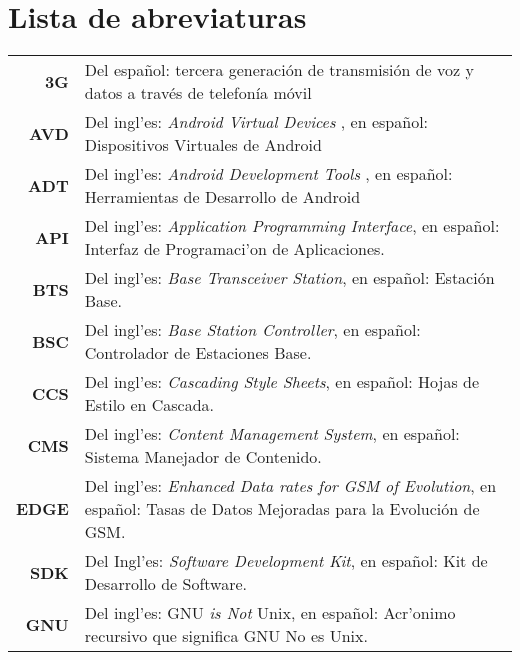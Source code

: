 
\chapter*{Lista de abreviaturas}  
\label{chap:abrev}


\begin{center}
\begin{longtable}{r p{13.5cm}} %

\textbf{3G} & Del espa\~nol: tercera generaci\'on de transmisi\'on de voz y datos a trav\'es de telefon\'ia m\'ovil\\

\textbf{AVD} & Del ingl'es:\textit{ Android Virtual Devices} , en espa\~nol: Dispositivos Virtuales de Android\\

\textbf{ADT} & Del ingl'es:\textit{ Android Development Tools} , en espa\~nol: Herramientas de Desarrollo de Android\\

\textbf{API} & Del ingl'es: \textit{Application Programming Interface}, en espa\~nol: Interfaz de Programaci'on de Aplicaciones.\\

\textbf{BTS} & Del ingl'es: \textit{Base Transceiver Station}, en espa\~nol: Estaci\'on Base.\\

\textbf{BSC} & Del ingl'es: \textit{Base Station Controller}, en espa\~nol: Controlador de Estaciones Base.\\

\textbf{CCS} & Del ingl'es:\textit{ Cascading Style Sheets}, en espa\~nol: Hojas de Estilo en Cascada.\\

\textbf{CMS} & Del ingl'es: \textit{Content Management System}, en espa\~nol: Sistema Manejador de Contenido.\\

\textbf{EDGE} & Del ingl'es: \textit{Enhanced Data rates for GSM of Evolution}, en espa\~nol: Tasas de Datos Mejoradas para la Evoluci\'on de GSM.\\

\textbf{SDK} & Del Ingl'es: \textit{Software Development Kit}, en espa\~nol: Kit de Desarrollo de Software.\\

\textbf{GNU} & Del ingl'es:  GNU \textit{is Not} Unix, en espa\~nol: Acr'onimo recursivo que significa GNU No es Unix. \\


\end{longtable}
\end{center}
